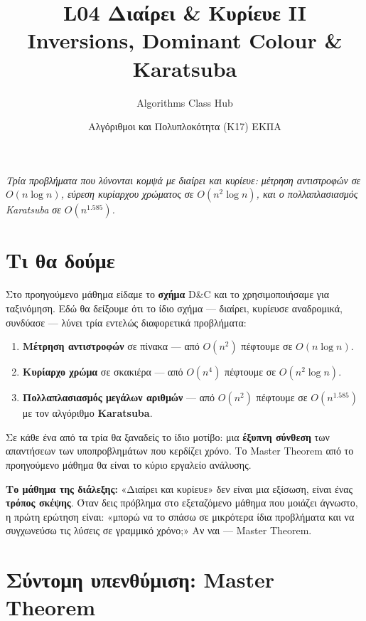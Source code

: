 \documentclass[11pt,a4paper]{article}
\title{\textbf{L04 \textperiodcentered{} Διαίρει \& Κυρίευε II}\\[2pt]
\large Inversions, Dominant Colour \& Karatsuba}
\author{Algorithms Class Hub}
\date{\small Αλγόριθμοι και Πολυπλοκότητα (K17) \textperiodcentered{} ΕΚΠΑ}
\begin{document}
\maketitle

\begin{center}\itshape\small
Τρία προβλήματα που λύνονται κομψά με διαίρει και κυρίευε: μέτρηση αντιστροφών σε
$O(n \log n)$, εύρεση κυρίαρχου χρώματος σε $O(n^2 \log n)$, και ο πολλαπλασιασμός
Karatsuba σε $O(n^{1.585})$.
\end{center}

\section{Τι θα δούμε}

Στο προηγούμενο μάθημα είδαμε το \textbf{σχήμα} D\&C και το χρησιμοποιήσαμε για
ταξινόμηση. Εδώ θα δείξουμε ότι το ίδιο σχήμα --- διαίρει, κυρίευσε αναδρομικά,
συνδύασε --- λύνει τρία εντελώς διαφορετικά προβλήματα:

\begin{enumerate}
  \item \textbf{Μέτρηση αντιστροφών} σε πίνακα --- από $O(n^2)$ πέφτουμε σε
  $O(n \log n)$.
  \item \textbf{Κυρίαρχο χρώμα} σε σκακιέρα --- από $O(n^4)$ πέφτουμε σε
  $O(n^2 \log n)$.
  \item \textbf{Πολλαπλασιασμός μεγάλων αριθμών} --- από $O(n^2)$ πέφτουμε σε
  $O(n^{1.585})$ με τον αλγόριθμο \textbf{Karatsuba}.
\end{enumerate}

Σε κάθε ένα από τα τρία θα ξαναδείς το ίδιο μοτίβο: μια \textbf{έξυπνη σύνθεση}
των απαντήσεων των υποπροβλημάτων που κερδίζει χρόνο. Το Master Theorem από το
προηγούμενο μάθημα θα είναι το κύριο εργαλείο ανάλυσης.

\begin{keypoint}
\textbf{Το μάθημα της διάλεξης:} «Διαίρει και κυρίευε» δεν είναι μια εξίσωση,
είναι ένας \textbf{τρόπος σκέψης}. Όταν δεις πρόβλημα στο εξεταζόμενο μάθημα που
μοιάζει άγνωστο, η πρώτη ερώτηση είναι: «μπορώ να το σπάσω σε μικρότερα ίδια
προβλήματα και να συγχωνεύσω τις λύσεις σε γραμμικό χρόνο;» Αν ναι --- Master
Theorem.
\end{keypoint}

\section{Σύντομη υπενθύμιση: Master Theorem}
\end{document}
